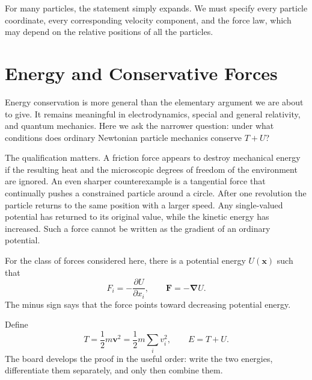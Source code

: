 For many particles, the statement simply expands. We must specify every
particle coordinate, every corresponding velocity component, and the force
law, which may depend on the relative positions of all the particles.

\begin{classroomqa}

\end{classroomqa}

\section{Energy and Conservative Forces}

Energy conservation is more general than the elementary argument we are about
to give. It remains meaningful in electrodynamics, special and general
relativity, and quantum mechanics. Here we ask the narrower question: under
what conditions does ordinary Newtonian particle mechanics conserve
\(T+U\)?

The qualification matters. A friction force appears to destroy mechanical
energy if the resulting heat and the microscopic degrees of freedom of the
environment are ignored. An even sharper counterexample is a tangential force
that continually pushes a constrained particle around a circle. After one
revolution the particle returns to the same position with a larger speed. Any
single-valued potential has returned to its original value, while the kinetic
energy has increased. Such a force cannot be written as the gradient of an
ordinary potential.

For the class of forces considered here, there is a potential energy
\(U(\mathbf x)\) such that
\begin{equation}
 F_i=-\frac{\partial U}{\partial x_i},
 \qquad
 \mathbf F=-\boldsymbol\nabla U.
 \label{eq:l02-conservative-force}
\end{equation}
The minus sign says that the force points toward decreasing potential energy.

Define
\begin{equation}
 T=\frac12 m\mathbf v^2
   =\frac12 m\sum_i v_i^2,
 \qquad
 E=T+U.
 \label{eq:l02-energy-definitions}
\end{equation}
The board develops the proof in the useful order: write the two energies,
differentiate them separately, and only then combine them.

